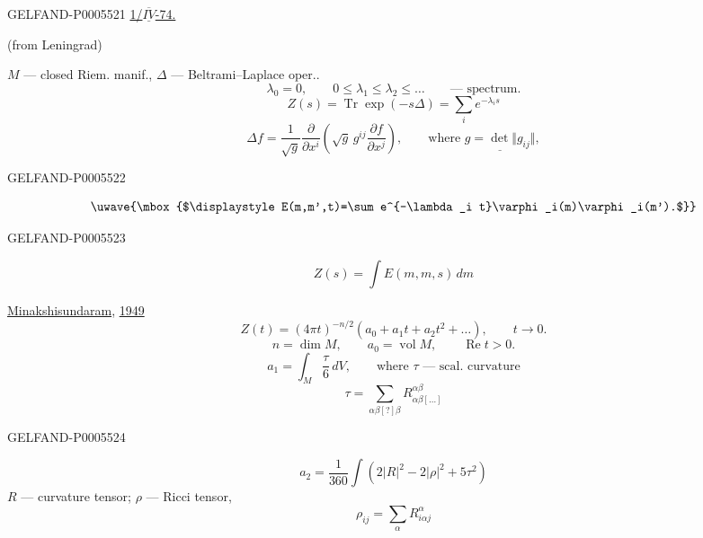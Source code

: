 \begin{GelfandAdjacentEvidence}{GELFAND-P000552}{1}
\uline{1/\mbox{$\overline{\underline{IV}}$}-74.}\qquad
{}

\qquad{}

\hspace{2em}(from Leningrad)\par
\(M\) — closed Riem. manif., \(\Delta\) — Beltrami–Laplace oper..
\[
\lambda_0=0,\qquad 0\le\lambda_1\le\lambda_2\le\ldots
\qquad\text{— spectrum.}
\]
\[
Z(s)=\operatorname{Tr}\exp(-s\Delta)=\sum_i e^{-\lambda_i s}
\]
\[
\Delta f=\frac{1}{\sqrt g}\frac{\partial}{\partial x^i}
\left(\sqrt g\, g^{ij}\frac{\partial f}{\partial x^j}\right),
\qquad\text{where }\underline{g=\det\Vert g_{ij}\Vert},
\]
\end{GelfandAdjacentEvidence}
\begin{GelfandAdjacentEvidence}{GELFAND-P000552}{2}

\[
\uwave{\mbox{$\displaystyle E(m,m',t)=\sum e^{-\lambda_i t}\varphi_i(m)\varphi_i(m').$}}
\]
\end{GelfandAdjacentEvidence}
\begin{GelfandAdjacentEvidence}{GELFAND-P000552}{3}

\[
Z(s)=\int E(m,m,s)\,dm
\]

\uline{Minakshisundaram}, \uline{1949}
\[
Z(t)=(4\pi t)^{-n/2}(a_0+a_1t+a_2t^2+\ldots),
\qquad t\to0.
\]
\[
n=\dim M,\qquad a_0=\operatorname{vol} M,\qquad \operatorname{Re}t>0.
\]
\[
a_1=\int_M \frac{\tau}{6}\,dV,
\qquad\text{where }\tau\text{ — scal. curvature}
\]
\[
\tau=\sum_{\alpha\beta[?]\beta}R_{\alpha\beta[\ldots]}^{\alpha\beta}
\]
\end{GelfandAdjacentEvidence}
\begin{GelfandAdjacentEvidence}{GELFAND-P000552}{4}

\[
a_2=\frac1{360}\int\left(2|R|^2-2|\rho|^2+5\tau^2\right)
\]
\(R\) — curvature tensor; \(\rho\) — Ricci tensor,
\[
\rho_{ij}=\sum_\alpha R_{i\alpha j}^{\alpha}
\]
\end{GelfandAdjacentEvidence}
